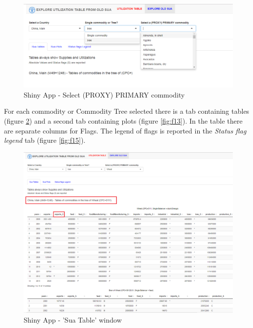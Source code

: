 \documentclass[]{article}
\begin{document}
\begin{figure}[H]

{\centering \includegraphics[width=1\linewidth]{images/UtilizationTable/11_selectPrimary} 

}

\caption{\label{fig:f11}Shiny App - Select (PROXY) PRIMARY commodity}\label{fig:f11}
\end{figure}

For each commodity or Commodity Tree selected there is a tab containing
tables (figure \ref{fig:f12}) and a second tab containing plots (figure
\ref{fig:f13}). In the table there are separate columns for Flags. The
legend of flags is reported in the \emph{Status flag legend} tab (figure
\ref{fig:f15}).

\begin{figure}[H]

{\centering \includegraphics[width=1\linewidth]{images/UtilizationTable/12_treeTableVisual} 

}

\caption{\label{fig:f12}Shiny App - 'Sua Table' window}\label{fig:f12}
\end{figure}
\end{document}
